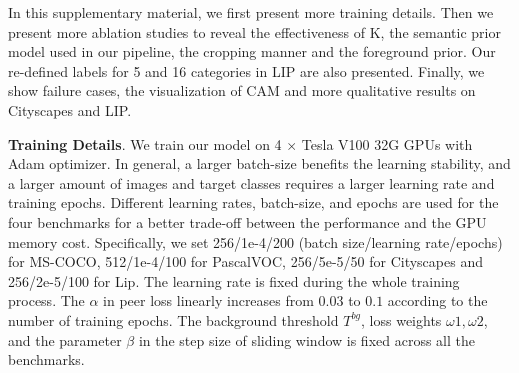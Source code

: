 \documentclass[runningheads]{llncs}
\newcommand{\PAR}[1]{\smallskip \noindent \textbf{#1}}
\begin{document}





\maketitle

In this supplementary material, we first present more training details. Then we present more ablation studies to reveal the effectiveness of K, the semantic prior model used in our pipeline, the cropping manner and the foreground prior. Our re-defined labels for 5 and 16 categories in LIP are also presented. Finally, we show failure cases, the visualization of CAM and more qualitative results on Cityscapes and LIP.

\PAR{Training Details}. We train our model on 4 $\times$ Tesla V100 32G GPUs with Adam optimizer. In general, a larger batch-size benefits the learning stability, and a larger amount of images and target classes requires a larger learning rate and training epochs. Different learning rates, batch-size, and epochs are used for the four benchmarks for a better trade-off between the performance and the GPU memory cost. Specifically, we set 256/1e-4/200 (batch size/learning rate/epochs) for MS-COCO, 512/1e-4/100 for PascalVOC, 256/5e-5/50 for Cityscapes and 256/2e-5/100 for Lip. The learning rate is fixed during the whole training process. The $\alpha$ in peer loss linearly increases from $0.03$ to $0.1$ according to the number of training epochs. The background threshold $T^{bg}$, loss weights $\omega 1, \omega 2$, and the parameter $\beta$ in the step size of sliding window is fixed across all the benchmarks. 
\end{document}
